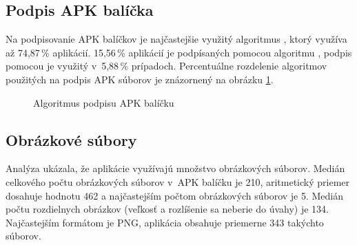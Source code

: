 \subsection{Podpis APK balíčka}
Na podpisovanie APK balíčkov je najčastejšie využitý algoritmus , ktorý využíva až 74,87\,\% aplikácií. 15,56\,\% aplikácií je podpísaných pomocou algoritmu , podpis pomocou  je využitý v~5,88\,\% prípadoch. Percentuálne rozdelenie algoritmov použitých na podpis APK súborov je znázornený na obrázku \ref{fig:signAlg}.

\begin{figure}[H]
\centering
\begin{bchart}[min=0,max=80,step=10,unit=\%]
\bcskip{6pt}
\bcskip{6pt}
\bcskip{6pt}
\bcskip{6pt}
\bcskip{6pt}
\bcskip{3pt}
\end{bchart}

\caption{Algoritmus podpisu APK balíčku}
\label{fig:signAlg}
\end{figure}

\subsection{Obrázkové súbory}
Analýza ukázala, že aplikácie využívajú množstvo obrázkových súborov. Medián celkového počtu obrázkových súborov v~APK balíčku je 210, aritmetický priemer dosahuje hodnotu 462 a najčastejším počtom obrázkových súborov je 5. Medián počtu rozdielnych obrázkov (veľkosť a rozlíšenie sa neberie do úvahy) je 134. Najčastejším formátom je PNG, aplikácia obsahuje priemerne 343 takýchto súborov.

